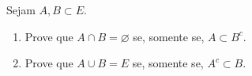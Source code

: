 \item %
Sejam $A,B\subset E$. 
\begin{enumerate}
\item Prove que $A\cap B=\varnothing $ se, somente se, $A\subset B^c$.
\item Prove que $A\cup B=E $ se, somente se, $A^c\subset B$.
\end{enumerate}